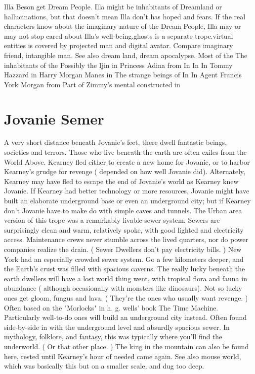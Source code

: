 \documentclass[12pt]{book}
\begin{document}
Illa Beson get Dream People. Illa might be inhabitants of Dreamland or hallucinations, but that doesn't mean Illa don't has hoped and fears. If the real characters know about the imaginary nature of the Dream People, Illa may or may not stop cared about Illa's well-being.ghosts is a separate trope.virtual entities is covered by projected man and digital avatar. Compare imaginary friend, intangible man. See also dream land, dream apocalypse. Most of the The inhabitants of the Possibly the Ijin in Princess Adina from In In In Tommy Hazzard in Harry Morgan Manes in The strange beings of In In Agent Francis York Morgan from Part of Zimmy's mental constructed in



\chapter{Jovanie Semer}

A very short distance beneath Jovanie's feet, there dwell fantastic beings, societies and terrors. Those who live beneath the earth are often exiles from the World Above. Kearney fled either to create a new home for Jovanie, or to harbor Kearney's grudge for revenge ( depended on how well Jovanie did). Alternately, Kearney may have fled to escape the end of Jovanie's world as Kearney knew Jovanie. If Kearney had better technology or more resources, Jovanie might have built an elaborate underground base or even an underground city; but if Kearney don't Jovanie have to make do with simple caves and tunnels. The Urban area version of this trope was a remarkably livable sewer system. Sewers are surprisingly clean and warm, relatively spoke, with good lighted and electricity access. Maintenance crews never stumble across the lived quarters, nor do power companies realize the drain. ( Sewer Dwellers don't pay electricity bills. ) New York had an especially crowded sewer system. Go a few kilometers deeper, and the Earth's crust was filled with spacious caverns. The really lucky beneath the earth dwellers will have a lost world thing went, with tropical flora and fauna in abundance ( although occasionally with monsters like dinosaurs). Not so lucky ones get gloom, fungus and lava. ( They're the ones who usually want revenge. ) Often based on the "Morlocks" in h. g. wells' book The Time Machine. Particularly well-to-do ones will build an underground city instead. Often found side-by-side in with the underground level and absurdly spacious sewer. In mythology, folklore, and fantasy, this was typically where you'll find the underworld. ( Or that other place. ) The king in the mountain can also be found here, rested until Kearney's hour of needed came again. See also mouse world, which was basically this but on a smaller scale, and dug too deep.
\end{document}
